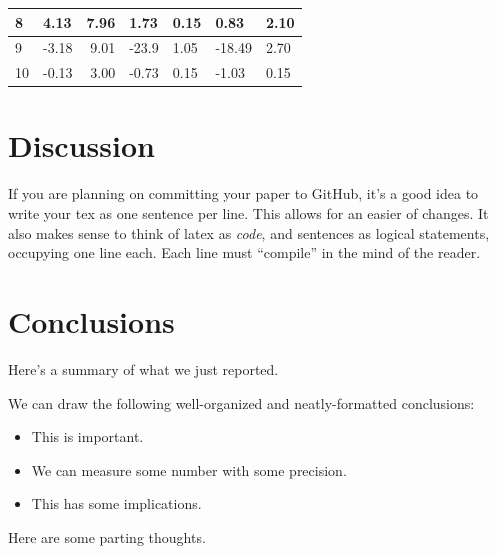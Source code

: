 \documentclass[\docopts]{\docclass}
\begin{document}
\begin{table}[]
\begin{tabular}{|l|l|r|l|l|l|l|}
8                                           & 4.13                   & 7.96                                                 & 1.73                    & 0.15                            & 0.83                    & 2.10                            \\ \hline
9                                           & -3.18                  & 9.01                                                 & -23.9                   & 1.05                            & -18.49                  & 2.70                            \\ \hline
10                                          & -0.13                  & 3.00                                                 & -0.73                   & 0.15                            & -1.03                   & 0.15                            \\ \hline
\end{tabular}
\end{table}

\section{Discussion}
\label{sec:discussion}

If you are planning on committing your paper to GitHub, it's a good idea to write your tex as one sentence per line.
This allows for an easier  of changes.
It also makes sense to think of latex as \emph{code}, and sentences as logical statements, occupying one line each.
Each line must ``compile'' in the mind of the reader.



\section{Conclusions}
\label{sec:conclusions}

Here's a summary of what we just reported.

We can draw the following well-organized and neatly-formatted conclusions:
\begin{itemize}
  \item This is important.
  \item We can measure some number with some precision.
  \item This has some implications.
\end{itemize}

Here are some parting thoughts.
\end{document}
